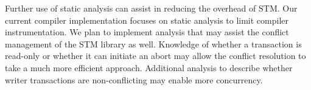 \documentclass[preprint]{sigplanconf}
\begin{document}
Further use of static analysis can assist in reducing the overhead of STM. Our current compiler implementation focuses on static analysis to limit compiler instrumentation. We plan to implement analysis that may assist the conflict management of the STM library as well. Knowledge of whether a transaction is read-only or whether it can initiate an abort may allow the conflict resolution to take a much more efficient approach. Additional analysis to describe whether writer transactions are non-conflicting may enable more concurrency.

\appendix



\end{document}
